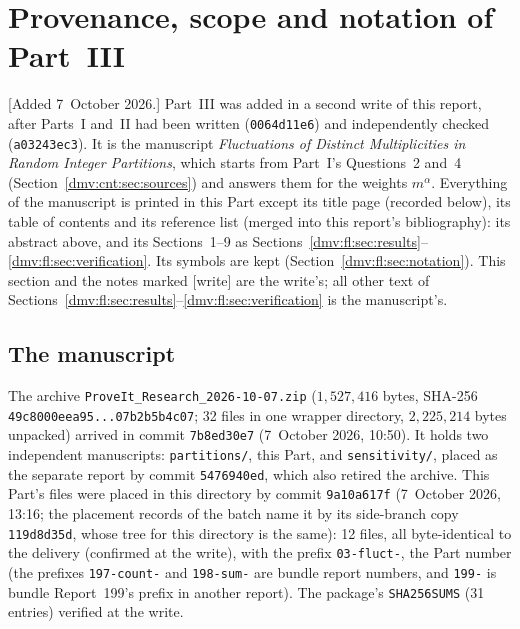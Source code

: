 \documentclass[11pt,letterpaper]{article}
\numberwithin{equation}{section}
\theoremstyle{definition}\newtheorem{definition}[theorem]{Definition}
\theoremstyle{remark}\newtheorem{remark}[theorem]{Remark}
\newcommand{\file}[1]{\nolinkurl{#1}}
\begin{document}
\section{Provenance, scope and notation of Part~III}\label{dmv:fl:sec:front}

[Added 7~October 2026.] Part~III was added in a second write of this
report, after Parts~I and~II had been written (\file{0064d11e6}) and
independently checked (\file{a03243ec3}). It is the manuscript
\emph{Fluctuations of Distinct Multiplicities in Random Integer
Partitions}, which starts from Part~I's Questions~2 and~4
(Section~\ref{dmv:cnt:sec:sources}) and answers them for the weights
$m^\alpha$. Everything of the manuscript is printed in this Part except
its title page (recorded below), its table of contents and its reference
list (merged into this report's bibliography): its abstract above, and
its Sections~1--9 as Sections~\ref{dmv:fl:sec:results}--\ref{dmv:fl:sec:verification}.
Its symbols are kept (Section~\ref{dmv:fl:sec:notation}). This section
and the notes marked [write] are the write's; all other text of
Sections~\ref{dmv:fl:sec:results}--\ref{dmv:fl:sec:verification} is the
manuscript's.

\subsection{The manuscript}\label{dmv:fl:sec:provenance}

The archive \file{ProveIt_Research_2026-10-07.zip} ($1{,}527{,}416$
bytes, SHA-256 \file{49c8000eea95...07b2b5b4c07}; 32 files in one wrapper
directory, $2{,}225{,}214$ bytes unpacked) arrived in commit
\file{7b8ed30e7} (7~October 2026, 10:50). It holds two independent
manuscripts: \file{partitions/}, this Part, and \file{sensitivity/}, placed
as the separate report
by commit \file{5476940ed}, which also retired the archive. This Part's
files were placed in this directory by commit \file{9a10a617f}
(7~October 2026, 13:16; the placement records of the batch name it by its
side-branch copy \file{119d8d35d}, whose tree for this directory is the
same): 12 files, all byte-identical to the delivery (confirmed at the
write), with the prefix \file{03-fluct-}, the Part number (the prefixes
\file{197-count-} and \file{198-sum-} are bundle report numbers, and
\file{199-} is bundle Report~199's prefix in another report). The
package's \file{SHA256SUMS} (31 entries) verified at the write.
\end{document}
